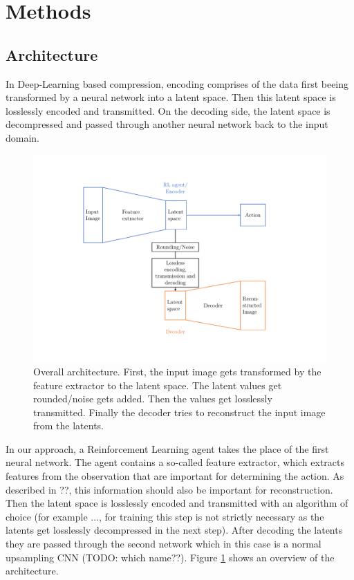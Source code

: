 \section{Methods}

\subsection{Architecture}\label{methods:Architecture}
    In Deep-Learning based compression, encoding comprises of the data first
    beeing transformed by a neural network into a latent space. Then this latent
    space is losslessly encoded and transmitted. On the decoding side, the
    latent space is decompressed and passed through another neural network back
    to the input domain.

    \begin{figure}[H]
        \centering
        \includegraphics[width=0.8\linewidth]{images/architecture.pdf}
        \caption{Overall architecture. First, the input image gets transformed by the feature extractor to the latent space. The latent values get rounded/noise gets added. Then the values get losslessly transmitted. Finally the decoder tries to reconstruct the input image from the latents.}
        \label{fig:Architecture}
    \end{figure}

    In our approach, a Reinforcement Learning agent takes the place of the first
    neural network. The agent contains a so-called feature extractor, which
    extracts features from the observation that are important for determining
    the action. As described in ??, this information should also be important
    for reconstruction. Then the latent space is losslessly encoded and
    transmitted with an algorithm of choice (for example ..., for training this
    step is not strictly necessary as the latents get losslessly decompressed in
    the next step). After decoding the latents they are passed through the
    second network which in this case is a normal upsampling CNN (TODO: which name??).
    Figure \ref{fig:Architecture} shows an overview of the architecture.


